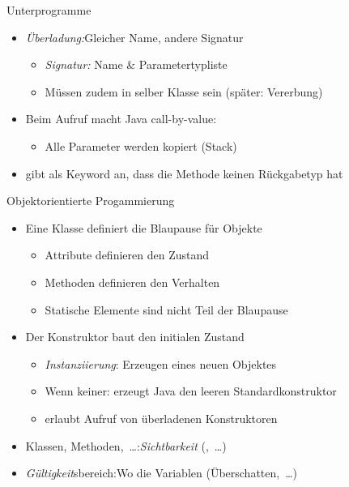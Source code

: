 {\begin{frame}[c]{Unterprogramme}
%
\begin{itemize}[<+(1)->]
   \itemsep15pt
   \item \textit{Überladung:}\quad\pause Gleicher Name, andere Signatur \begin{itemize}
      \item \textit{Signatur:} \pause Name \& Parametertypliste
      \item Müssen zudem in selber Klasse sein (später: Vererbung)
   \end{itemize}
   \item Beim Aufruf macht Java call-by-value: \begin{itemize}
      \item Alle Parameter werden kopiert (Stack)
   \end{itemize}
   \item {} gibt als Keyword an, dass die Methode keinen Rückgabetyp hat
\end{itemize}
\end{frame}

\begin{frame}[c]{Objektorientierte Progammierung}
%
\begin{itemize}[<+(1)->]
   \itemsep10pt
   \item Eine Klasse definiert die Blaupause für Objekte \begin{itemize}
      \item Attribute definieren den Zustand
      \item Methoden definieren den Verhalten
      \item Statische Elemente sind nicht Teil der Blaupause 
   \end{itemize}
   \item Der Konstruktor baut den initialen Zustand \begin{itemize}
      \item \textit{Instanziierung}: \pause Erzeugen eines neuen Objektes
      \item Wenn keiner: \pause erzeugt Java den leeren Standardkonstruktor
      \item {} erlaubt Aufruf von überladenen Konstruktoren
   \end{itemize}
   \item Klassen, Methoden,~\ldots:\quad \textit{Sichtbarkeit} (,~\ldots)
   \item \textit{Gültigkeit}sbereich:\quad Wo die Variablen  (Überschatten,~\ldots)
\end{itemize}
\end{frame}

}
